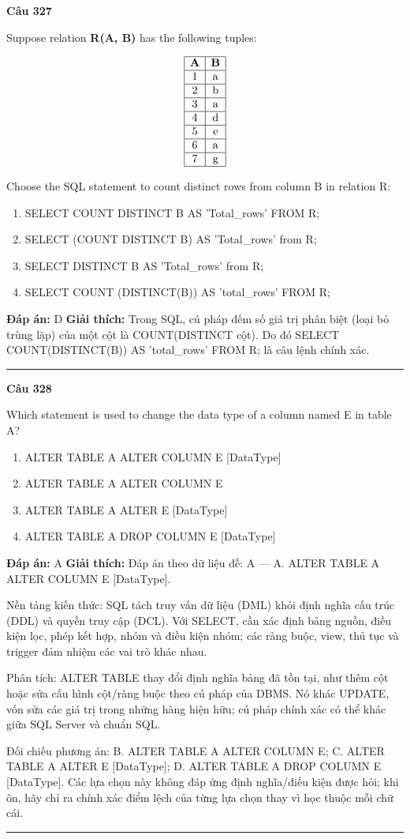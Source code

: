 \documentclass[11pt,a4paper]{article}
\newenvironment{question}[1]{%
  \par\vspace{1em}\noindent\textbf{\large Câu #1}\par\vspace{0.4em}
}{%
  \par\vspace{1em}\hrule\vspace{0.6em}
}
\newenvironment{choices}{%
  \begin{enumerate}[label=\textbf{\Alph*.},leftmargin=2.2em,itemsep=2pt,topsep=3pt]
}{%
  \end{enumerate}
}
\newcommand{\choice}{\item}
\begin{document}
\begin{question}{327}
Suppose relation \textbf{R(A, B)} has the following tuples:

$$\begin{array}{|c|c|}
\hline
\textbf{A} & \textbf{B} \\
\hline
1 & \text{a} \\
\hline
2 & \text{b} \\
\hline
3 & \text{a} \\
\hline
4 & \text{d} \\
\hline
5 & \text{e} \\
\hline
6 & \text{a} \\
\hline
7 & \text{g} \\
\hline
\end{array}$$

Choose the SQL statement to count distinct rows from column B in relation R:
\begin{choices}
\choice SELECT COUNT DISTINCT B AS 'Total_rows' FROM R;
\choice SELECT (COUNT DISTINCT B) AS 'Total_rows' from R;
\choice SELECT DISTINCT B AS 'Total_rows' from R;
\choice SELECT COUNT (DISTINCT(B)) AS 'total_rows' FROM R;
\end{choices}
\textbf{Đáp án:} D
\textbf{Giải thích:} Trong SQL, cú pháp đếm số giá trị phân biệt (loại bỏ trùng lặp) của một cột là COUNT(DISTINCT cột). Do đó SELECT COUNT(DISTINCT(B)) AS 'total_rows' FROM R; là câu lệnh chính xác.
\end{question}

\begin{question}{328}
Which statement is used to change the data type of a column named E in table A?
\begin{choices}
\choice ALTER TABLE A ALTER COLUMN E [DataType]
\choice ALTER TABLE A ALTER COLUMN E
\choice ALTER TABLE A ALTER E [DataType]
\choice ALTER TABLE A DROP COLUMN E [DataType]
\end{choices}
\textbf{Đáp án:} A
\textbf{Giải thích:} Đáp án theo dữ liệu đề: A — A. ALTER TABLE A ALTER COLUMN E [DataType].

Nền tảng kiến thức: SQL tách truy vấn dữ liệu (DML) khỏi định nghĩa cấu trúc (DDL) và quyền truy cập (DCL). Với SELECT, cần xác định bảng nguồn, điều kiện lọc, phép kết hợp, nhóm và điều kiện nhóm; các ràng buộc, view, thủ tục và trigger đảm nhiệm các vai trò khác nhau.

Phân tích: ALTER TABLE thay đổi định nghĩa bảng đã tồn tại, như thêm cột hoặc sửa cấu hình cột/ràng buộc theo cú pháp của DBMS. Nó khác UPDATE, vốn sửa các giá trị trong những hàng hiện hữu; cú pháp chính xác có thể khác giữa SQL Server và chuẩn SQL.

Đối chiếu phương án: B. ALTER TABLE A ALTER COLUMN E; C. ALTER TABLE A ALTER E [DataType]; D. ALTER TABLE A DROP COLUMN E [DataType]. Các lựa chọn này không đáp ứng định nghĩa/điều kiện được hỏi; khi ôn, hãy chỉ ra chính xác điểm lệch của từng lựa chọn thay vì học thuộc mỗi chữ cái.
\end{question}
\end{document}
